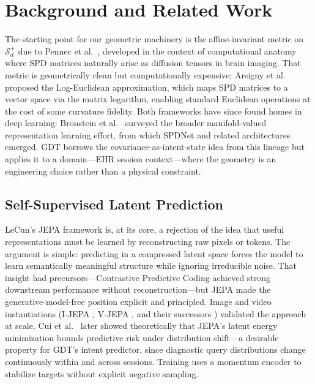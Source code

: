 \documentclass[review]{elsarticle}
\begin{document}
\section{Background and Related Work}
\label{sec:background}
The starting point for our geometric machinery is the affine-invariant metric on
$\mathcal{S}_d^+$ due to Pennec et al.\ \cite{pennec2006_spd}, developed in the
context of computational anatomy where SPD matrices naturally arise as diffusion
tensors in brain imaging. That metric is geometrically clean but computationally
expensive; Arsigny et al.\ \cite{arsigny2007_logeuclidean} proposed the
Log-Euclidean approximation, which maps SPD matrices to a vector space via the
matrix logarithm, enabling standard Euclidean operations at the cost of some
curvature fidelity. Both frameworks have since found homes in deep learning:
Bronstein et al.\ \cite{bronstein2017,bronstein2021_gdl} surveyed the broader
manifold-valued representation learning effort, from which SPDNet
\cite{huang2017_spdnet} and related architectures \cite{lopez2021} emerged. GDT
borrows the covariance-as-intent-state idea from this lineage but applies it to a
domain---EHR session context---where the geometry is an engineering choice rather
than a physical constraint.

\subsection{Self-Supervised Latent Prediction}
LeCun's JEPA framework \cite{lecun2022} is, at its core, a rejection of the idea
that useful representations must be learned by reconstructing raw pixels or tokens.
The argument is simple: predicting in a compressed latent space forces the model
to learn semantically meaningful structure while ignoring irreducible noise. That
insight had precursors---Contrastive Predictive Coding \cite{oord2018_cpc} achieved
strong downstream performance without reconstruction---but JEPA made the
generative-model-free position explicit and principled. Image and video
instantiations (I-JEPA \cite{assran2023_ijepa}, V-JEPA \cite{bardes2024_vjepa},
and their successors \cite{assran2025_vjepa2,murlabadia2026_vjepa21}) validated
the approach at scale. Cui et al.\ \cite{cui2026_jepa_theory} later showed
theoretically that JEPA's latent energy minimization bounds predictive risk under
distribution shift---a desirable property for GDT's intent predictor, since
diagnostic query distributions change continuously within and across sessions.
Training uses a momentum encoder \cite{grill20} to stabilize targets without
explicit negative sampling.
\end{document}
